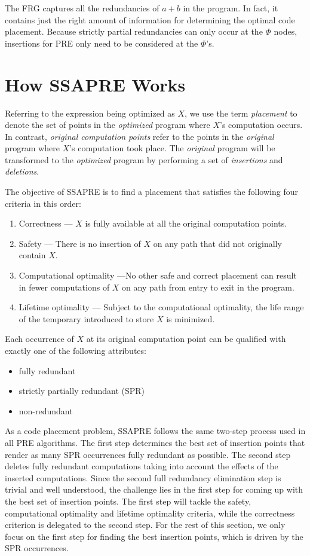 The FRG captures all the redundancies of $a+b$ in the program.  
In fact, it contains just the right
amount of information for determining the optimal code placement.  Because
strictly partial redundancies can only occur at the $\Phi$ nodes,
insertions for PRE only need to be considered at the $\Phi$'s.

\section{How SSAPRE Works}
\label{section:Part3:Pre_not_helped:SSAPRE}

Referring to the expression being optimized as $X$,
we use the term \emph{placement} to denote the set of points in the 
\emph{optimized} program where $X$'s computation occurs. In contrast,
\emph{original computation points} refer to the points in the \emph{original} 
program where $X$'s computation took place.  The \emph{original} program will be
transformed to the \emph{optimized} program by performing a set of
\emph{insertions} and \emph{deletions}.  

The objective of SSAPRE is to find
a placement that satisfies the following four criteria in this order:
\begin{enumerate}
\item Correctness --- $X$ is fully available at all the original computation
points.
\item Safety --- There is no insertion of $X$ on any path that did not 
originally contain $X$. 
\item Computational optimality ---No other safe and correct placement can 
result in fewer computations of $X$ on any path from entry to exit in the program.
\item Lifetime optimality --- Subject to the computational optimality,
the life range of the temporary introduced to store $X$ is minimized.
\end{enumerate}

Each occurrence of $X$ at its original computation point can be qualified
with exactly one of the following attributes:
\begin{itemize}
\item fully redundant
\item strictly partially redundant (SPR)
\item non-redundant
\end{itemize}

As a code placement problem, SSAPRE follows the same two-step process used
in all PRE algorithms.  The first step determines the best set of insertion 
points that render as many SPR occurrences fully redundant as possible.
The second step deletes fully redundant computations taking into account the
effects of the inserted computations.  Since the second full redundancy
elimination step is 
trivial and well understood, the challenge lies in the first step
for coming up with the best set of insertion points.  The first step will
tackle the safety, computational optimality and lifetime optimality criteria,
while the correctness criterion is delegated to the second step.
For the rest of this section, we only focus on the first step for
finding the best insertion points, which is driven by the SPR occurrences.

